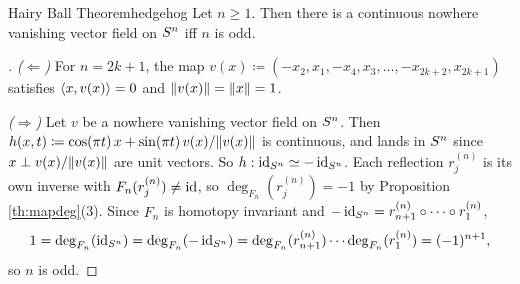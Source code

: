 \begin{theorem}{Hairy Ball Theorem}{hedgehog}
  Let $n\geq1$. Then there is a continuous nowhere vanishing vector field on $S^{n}$ iff $n$ is odd.
\end{theorem}
\begin{proof}[]
  \emph{($\Leftarrow$)} For $n=2k+1$, the map $v(x)\coloneqq(-x_2,x_1,-x_4,x_3,\dots,-x_{2k+2},x_{2k+1})$ satisfies $\langle x,v(x)\rangle=0$ and $\lVert v(x)\rVert=\lVert x\rVert=1$.

  \emph{($\Rightarrow$)} Let $v$ be a nowhere vanishing vector field on $S^{n}$. Then $h(x,t)\coloneqq\cos(\pi t)\,x+\sin(\pi t)\,v(x)/\lVert v(x)\rVert$ is continuous, and lands in $S^{n}$ since $x\perp v(x)/\lVert v(x)\rVert$ are unit vectors. So $h:\operatorname{id}_{S^{n}}\simeq-\operatorname{id}_{S^{n}}$. Each reflection $r_j^{(n)}$ is its own inverse with $F_n(r_j^{(n)})\neq\operatorname{id}$, so $\deg_{F_n}(r_j^{(n)})=-1$ by Proposition \ref{th:mapdeg}(3). Since $F_n$ is homotopy invariant and $-\operatorname{id}_{S^{n}}=r_{n+1}^{(n)}\circ\dots\circ r_1^{(n)}$, \[
    1=\deg_{F_n}(\operatorname{id}_{S^{n}})=\deg_{F_n}(-\operatorname{id}_{S^{n}})=\deg_{F_n}(r_{n+1}^{(n)})\cdots\deg_{F_n}(r_1^{(n)})=(-1)^{n+1},
  \]
  so $n$ is odd.
\end{proof}